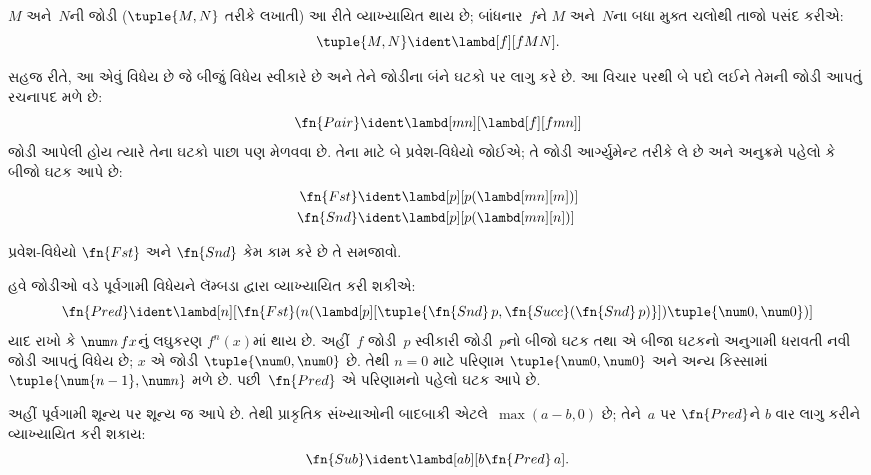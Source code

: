\begin{defn}
$M$ અને~$N$ની જોડી ($\tuple{M,N}$ તરીકે લખાતી)
આ રીતે વ્યાખ્યાયિત થાય છે; બાંધનાર~$f$ને
$M$ અને~$N$ના બધા મુક્ત ચલોથી તાજો પસંદ કરીએ:
\[
\tuple{M,N} \ident \lambd[f][fMN].
\]
\end{defn}
  
સહજ રીતે, આ એવું વિધેય છે જે બીજું વિધેય
સ્વીકારે છે અને તેને જોડીના બંને ઘટકો પર લાગુ
કરે છે. આ વિચાર પરથી બે પદો લઈને તેમની
જોડી આપતું રચનાપદ મળે છે:
\[
  \fn{Pair} \ident \lambd[mn][\lambd[f][fmn]]
\]
જોડી આપેલી હોય ત્યારે તેના ઘટકો પાછા પણ
મેળવવા છે. તેના માટે બે પ્રવેશ-વિધેયો જોઈએ;
તે જોડી આર્ગ્યુમેન્ટ તરીકે લે છે અને અનુક્રમે
પહેલો કે બીજો ઘટક આપે છે:
\begin{align*}
  \fn{Fst} & \ident \lambd[p][p(\lambd[mn][m])]\\
  \fn{Snd} & \ident \lambd[p][p(\lambd[mn][n])]
\end{align*}

\begin{prob}
  પ્રવેશ-વિધેયો $\fn{Fst}$ અને $\fn{Snd}$
  કેમ કામ કરે છે તે સમજાવો.
\end{prob}

હવે જોડીઓ વડે પૂર્વગામી વિધેયને લૅમ્બડા દ્વારા વ્યાખ્યાયિત
કરી શકીએ:
\[
  \fn{Pred} \ident \lambd[n][\fn{Fst}(n (\lambd[p][\tuple{\fn{Snd}\, {p}, \fn{Succ}(\fn{Snd}\, {p})}]) \tuple{\num 0, \num 0})]
\]
યાદ રાખો કે $\num n\, f x$નું લઘુકરણ
$f^{n}(x)$માં થાય છે. અહીં~$f$ જોડી~$p$
સ્વીકારી જોડી~$p$નો બીજો ઘટક તથા એ બીજા ઘટકનો
અનુગામી ધરાવતી નવી જોડી આપતું વિધેય છે;
$x$ એ જોડી $\tuple{\num 0,\num 0}$ છે.
તેથી $n=0$ માટે પરિણામ $\tuple{\num 0,\num 0}$
અને અન્ય કિસ્સામાં $\tuple{\num{n-1}, \num n}$
મળે છે. પછી~$\fn{Pred}$ એ પરિણામનો
પહેલો ઘટક આપે છે.

અહીં પૂર્વગામી શૂન્ય પર શૂન્ય જ આપે છે. તેથી પ્રાકૃતિક
સંખ્યાઓની બાદબાકી એટલે~$\max(a-b,0)$ છે; તેને~$a$ પર $\fn{Pred}$ને $b$ વાર
લાગુ કરીને વ્યાખ્યાયિત કરી શકાય:
\[
\fn{Sub} \ident \lambd[ab][b \fn{Pred}\, a].
\]
\endgroup

